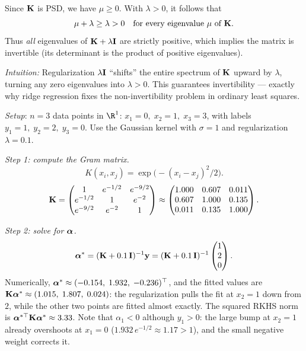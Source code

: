 \begin{notechapter}
\begin{intuition}
Since $\mathbf{K}$ is PSD, we have $\mu \ge 0$. With $\lambda > 0$,
it follows that
\[
\mu + \lambda \ge \lambda > 0 \quad \text{for every eigenvalue $\mu$ of $\mathbf{K}$}.
\]
Thus \emph{all} eigenvalues of $\mathbf{K} + \lambda\mathbf{I}$
are strictly positive, which implies the matrix is invertible
(its determinant is the product of positive eigenvalues).

\smallskip
\emph{Intuition:} Regularization $\lambda\mathbf{I}$ ``shifts'' the entire
spectrum of $\mathbf{K}$ upward by $\lambda$, turning any zero eigenvalues
into $\lambda > 0$. This guarantees invertibility --- exactly why ridge
regression fixes the non-invertibility problem in ordinary least squares.
\end{intuition}

\begin{example}
\emph{Setup}: $n = 3$ data points in $\R^1$: $x_1 = 0,\; x_2 = 1,\;
x_3 = 3$, with labels $y_1 = 1,\; y_2 = 2,\; y_3 = 0$. Use the Gaussian
kernel with $\sigma = 1$ and regularization $\lambda = 0.1$.

\emph{Step 1: compute the Gram matrix.}
\[
K(x_i, x_j) = \exp\!\bigl(-(x_i - x_j)^2/2\bigr).
\]
\[
\mathbf{K} = \begin{pmatrix}
1 & e^{-1/2} & e^{-9/2} \\
e^{-1/2} & 1 & e^{-2} \\
e^{-9/2} & e^{-2} & 1
\end{pmatrix}
\approx \begin{pmatrix}
1.000 & 0.607 & 0.011 \\
0.607 & 1.000 & 0.135 \\
0.011 & 0.135 & 1.000
\end{pmatrix}.
\]

\emph{Step 2: solve for $\boldsymbol{\alpha}$.}
\[
\boldsymbol{\alpha}^* = (\mathbf{K} + 0.1\,\mathbf{I})^{-1}\mathbf{y} = (\mathbf{K} +
0.1\,\mathbf{I})^{-1}\begin{pmatrix}1\\2\\0\end{pmatrix}.
\]
Numerically, $\boldsymbol{\alpha}^* \approx (-0.154,\; 1.932,\; -0.236)^\top$, and the fitted values are $\mathbf{K}\boldsymbol{\alpha}^* \approx (1.015,\; 1.807,\; 0.024)$: the regularization pulls the fit at $x_2 = 1$ down from $2$, while the other two points are fitted almost exactly. The squared RKHS norm is $\boldsymbol{\alpha}^{*\top}\mathbf{K}\boldsymbol{\alpha}^* \approx 3.33$. Note that $\alpha_1 < 0$ although $y_1 > 0$: the large bump at $x_2 = 1$ already overshoots at $x_1 = 0$ ($1.932\,e^{-1/2} \approx 1.17 > 1$), and the small negative weight corrects it.


\end{example}
\end{notechapter}
